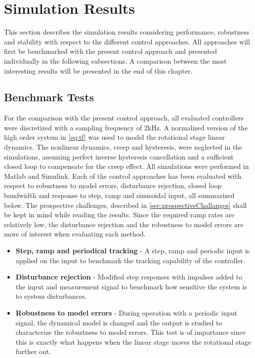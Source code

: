 \chapter{Simulation Results}\label{cha:result}
This section describes the simulation results considering performance, robustness and stability with respect to the different control approaches. All approaches will first be benchmarked with the present control approach and presented individually in the following subsections. A comparison between the most interesting results will be presented in the end of this chapter.

\section{Benchmark Tests}
For the comparison with the present control approach, all evaluated controllers were discretized with a sampling frequency of 2kHz. A normalized version of the high order system in \eqref{eq:tf} was used to model the rotational stage linear dynamics. The nonlinear dynamics, creep and hysteresis, were neglected in the simulations, assuming perfect inverse hysteresis cancellation and a sufficient closed loop to compensate for the creep effect. All simulations were performed in Matlab and Simulink. Each of the control approaches has been evaluated with respect to robustness to model errors, disturbance rejection, closed loop bandwidth and response to step, ramp and sinusoidal input, all summarized below. The prospective challenges, described in \ref{sec:prospectiveChallanges} shall be kept in mind while reading the results. Since the required ramp rates are relatively low, the disturbance rejection and the robustness to model errors are more of interest when evaluating each method.

\begin{itemize}
\item {\bf Step, ramp and periodical tracking} - A step, ramp and periodic input is applied on the input to benchmark the tracking capability of the controller.
\item {\bf Disturbance rejection} - Modified step responses with impulses added to the input and measurement signal to benchmark how sensitive the system is to system disturbances.
\item {\bf Robustness to model errors} - During operation with a periodic input signal, the dynamical model is changed and the output is studied to characterize the robustness to model errors. This test is of importance since this is exactly what happens when the linear stage moves the rotational stage further out.
\end{itemize}

